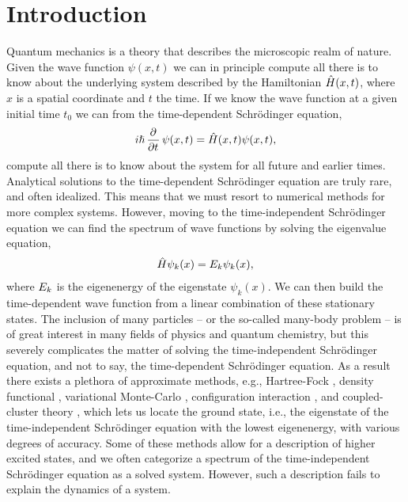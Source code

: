 \chapter{Introduction}
    Quantum mechanics is a theory that describes the microscopic realm of
    nature.
    Given the wave function $\psi(x, t)$ we can in principle compute all there
    is to know about the underlying system described by the Hamiltonian
    $\hat{H}(x, t)$, where $x$ is a spatial coordinate and $t$ the time.
    If we know the wave function at a given initial time $t_0$ we can from the
    time-dependent Schrödinger equation,
    \begin{align}
        i\hslash\dpd{}{t}\psi(x, t) = \hamil(x, t)\psi(x, t),
    \end{align}
    compute all there is to know about the system for all future and earlier
    times.
    Analytical solutions to the time-dependent Schrödinger equation are truly
    rare, and often idealized.
    This means that we must resort to numerical methods for more complex
    systems.
    However, moving to the time-independent Schrödinger equation we can find the
    spectrum of wave functions by solving the eigenvalue equation,
    \begin{align}
        \hat{H}\psi_k(x) = E_k\psi_k(x),
    \end{align}
    where $E_k$ is the eigenenergy of the eigenstate $\psi_k(x)$.
    We can then build the time-dependent wave function from a linear combination
    of these stationary states.
    The inclusion of many particles -- or the so-called many-body problem -- is
    of great interest in many fields of physics and quantum chemistry, but this
    severely complicates the matter of solving the time-independent Schrödinger
    equation, and not to say, the time-dependent Schrödinger equation.
    As a result there exists a plethora of approximate methods, e.g.,
    Hartree-Fock \cite{hartree_1928, szabo1996modern}, density functional
    \cite{ullrich2011time}, variational Monte-Carlo \cite{hjorth2017advanced},
    configuration interaction \cite{helgaker-molecular}, and coupled-cluster
    theory \cite{coester1958421}, which lets us locate the ground state, i.e.,
    the eigenstate of the time-independent Schrödinger equation with the lowest
    eigenenergy, with various degrees of accuracy.
    Some of these methods allow for a description of higher excited states, and
    we often categorize a spectrum of the time-independent Schrödinger equation
    as a solved system.
    However, such a description fails to explain the dynamics of a system.

